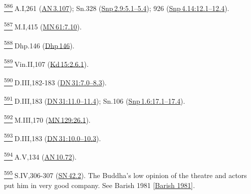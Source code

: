 \label{footprints_split_025.html_fn586}
\hyperref[footprints_split_015.htmlux5cux23fnref586]{\textsuperscript{586}} A.I,261
(\href{https://suttacentral.net/an3.107/en/sujato}{AN\,3.107}); Sn.328
(\href{https://suttacentral.net/snp2.9/en/sujato\#5.1}{Snp\,2.9:5.1--5.4});
926
(\href{https://suttacentral.net/snp4.14/en/sujato\#12.1}{Snp\,4.14:12.1--12.4}).

\label{footprints_split_025.html_fn587}
\hyperref[footprints_split_015.htmlux5cux23fnref587]{\textsuperscript{587}} M.I,415
(\href{https://suttacentral.net/mn61/en/sujato\#7.10}{MN\,61:7.10}).

\label{footprints_split_025.html_fn588}
\hyperref[footprints_split_015.htmlux5cux23fnref588]{\textsuperscript{588}} Dhp.146
(\href{https://suttacentral.net/dhp146/en/sujato}{Dhp\,146}).

\label{footprints_split_025.html_fn589}
\hyperref[footprints_split_015.htmlux5cux23fnref589]{\textsuperscript{589}} Vin.II,107
(\href{https://suttacentral.net/pli-tv-kd15/en/brahmali\#2.6.1}{Kd\,15:2.6.1}).

\label{footprints_split_025.html_fn590}
\hyperref[footprints_split_015.htmlux5cux23fnref590]{\textsuperscript{590}} D.III,182-183
(\href{https://suttacentral.net/dn31/en/sujato\#7.0}{DN\,31:7.0--8.3}).

\label{footprints_split_025.html_fn591}
\hyperref[footprints_split_015.htmlux5cux23fnref591]{\textsuperscript{591}} D.III,183
(\href{https://suttacentral.net/dn31/en/sujato\#11.0}{DN\,31:11.0--11.4});
Sn.106
(\href{https://suttacentral.net/snp1.6/en/sujato\#17.1}{Snp\,1.6:17.1--17.4}).

\label{footprints_split_025.html_fn592}
\hyperref[footprints_split_015.htmlux5cux23fnref592]{\textsuperscript{592}} M.III,170
(\href{https://suttacentral.net/mn129/en/sujato\#26.1}{MN\,129:26.1}).

\label{footprints_split_025.html_fn593}
\hyperref[footprints_split_015.htmlux5cux23fnref593]{\textsuperscript{593}} D.III,183
(\href{https://suttacentral.net/dn31/en/sujato\#10.0}{DN\,31:10.0--10.3}).

\label{footprints_split_025.html_fn594}
\hyperref[footprints_split_015.htmlux5cux23fnref594]{\textsuperscript{594}} A.V,134
(\href{https://suttacentral.net/an10.72/en/sujato}{AN\,10.72}).

\label{footprints_split_025.html_fn595}
\hyperref[footprints_split_015.htmlux5cux23fnref595]{\textsuperscript{595}} S.IV,306-307
(\href{https://suttacentral.net/sn42.2/en/sujato}{SN\,42.2}). The
Buddha's low opinion of the theatre and actors put him in very good
company. See {Barish 1981
{{[}\hyperref[footprints_split_023.htmlux5cux23Barishux5cux25201981]{Barish
1981}{]}}}.

